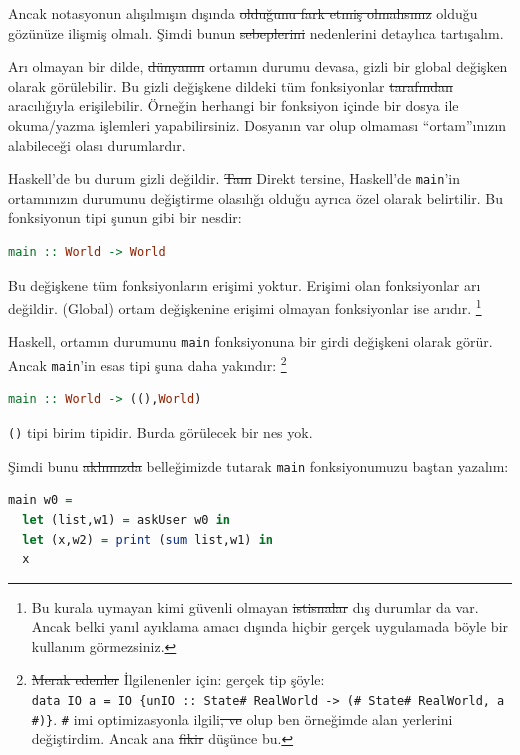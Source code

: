 \documentclass[a4paper,14pt,openany]{extbook} %
\begin{document}
Ancak notasyonun alışılmışın dışında \st{olduğunu fark etmiş olmalısınız} olduğu gözünüze ilişmiş olmalı.
Şimdi bunun \st{sebeplerini} nedenlerini detaylıca tartışalım.

Arı olmayan bir dilde, \st{dünyanın} ortamın durumu devasa, gizli bir global
değişken olarak görülebilir. Bu gizli değişkene dildeki tüm fonksiyonlar
\st{tarafından} aracılığıyla erişilebilir. Örneğin herhangi bir fonksiyon içinde bir dosya
ile okuma/yazma işlemleri yapabilirsiniz. Dosyanın var olup olmaması
``ortam''ınızın alabileceği olası durumlardır.

Haskell'de bu durum gizli değildir. \st{Tam} Direkt tersine, Haskell'de
\lstinline!main!'in ortamınızın durumunu değiştirme olasılığı olduğu
ayrıca özel olarak belirtilir. Bu fonksiyonun tipi şunun gibi bir nesdir:

\begin{lstlisting}[language=Haskell]
  main :: World -> World
\end{lstlisting}

Bu değişkene tüm fonksiyonların erişimi yoktur. Erişimi olan
fonksiyonlar arı değildir. (Global) ortam değişkenine erişimi olmayan
fonksiyonlar ise arıdır. \footnote{Bu kurala uymayan kimi güvenli olmayan
  \st{istisnalar} dış durumlar da var. Ancak belki yanıl ayıklama amacı dışında hiçbir gerçek
  uygulamada böyle bir kullanım görmezsiniz.}

Haskell, ortamın durumunu \lstinline!main! fonksiyonuna bir girdi
değişkeni olarak görür. Ancak \lstinline!main!'in esas tipi şuna daha
yakındır: \footnote{\st{Merak edenler} İlgilenenler için: gerçek tip şöyle:\\
  \lstinline!data IO a = IO {unIO :: State# RealWorld -> (# State# RealWorld, a #)}!.
  \lstinline!#! imi optimizasyonla ilgili\st{, ve} olup ben örneğimde alan
  yerlerini değiştirdim. Ancak ana \st{fikir} düşünce bu.}

\begin{lstlisting}[language=Haskell]
  main :: World -> ((),World)
\end{lstlisting}

\lstinline!()! tipi birim tipidir. Burda görülecek bir nes yok.

Şimdi bunu \st{aklımızda} belleğimizde tutarak \lstinline!main! fonksiyonumuzu baştan
yazalım:

\begin{lstlisting}[language=Haskell]
  main w0 =
  let (list,w1) = askUser w0 in
  let (x,w2) = print (sum list,w1) in
  x
\end{lstlisting}
\end{document}
